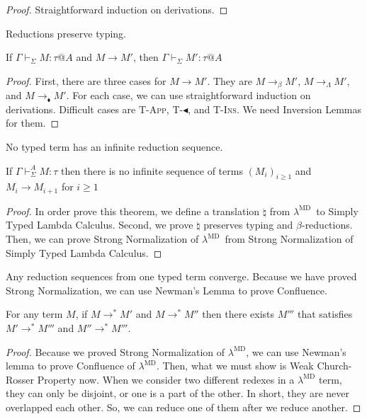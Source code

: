 \documentclass[runningheads]{llncs}
\newcommand{\LMD}{$\lambda^{\textrm{MD}}$\xspace}
\newcommand{\G}{\Gamma}
\newcommand{\V}{\vdash_\Sigma}
\newcommand{\TBL}{\blacktriangleleft}
\newcommand{\TApp}{\textsc{T-App}}
\newcommand{\TTBL}{\textsc{T-$\TBL$}}
\newcommand{\TIns}{\textsc{T-Ins}}
\begin{document}
\begin{proof}
	Straightforward induction on derivations.
\end{proof}

Reductions preserve typing.
\begin{theorem}[Preservation]
	If $\G\V M:\tau @A$ and $M \longrightarrow M'$, then $\G\V M':\tau @A$\\
\end{theorem}

\begin{proof}
	First, there are three cases for $M \longrightarrow M'$.
	They are $M \longrightarrow_\beta M'$, $M \longrightarrow_\Lambda M'$, and $M \longrightarrow_\blacklozenge M'$.
	For each case, we can use straightforward induction on derivations.
	Difficult cases are \TApp, \TTBL, and \TIns.
	We need Inversion Lemmas for them.
\end{proof}

No typed term has an infinite reduction sequence.
\begin{theorem}
	If $\G\V^A M:\tau$ then there is no infinite sequence of terms $(M_i)_{i\ge1}$ and 
	$M_i \longrightarrow M_{i+1}$ for $i\ge 1$
\end{theorem}

\begin{proof}
	In order prove this theorem, we define a translation $\natural$ from \LMD\ to Simply Typed Lambda Calculus.
	Second, we prove $\natural$ preserves typing and $\beta$-reductions.
	Then, we can prove Strong Normalization of \LMD\ from Strong Normalization of Simply Typed Lambda Calculus.
\end{proof}

Any reduction sequences from one typed term converge.
Because we have proved Strong Normalization, we can use Newman's Lemma to prove Confluence.
\begin{theorem}[Confluence]
	For any term $M$, if $M \longrightarrow^* M'$ and $M \longrightarrow^* M''$ then
	there exists $M'''$ that satisfies $M' \longrightarrow^* M'''$ and $M'' \longrightarrow^* M'''$.
\end{theorem}

\begin{proof}
	Because we proved Strong Normalization of \LMD, 
	we can use Newman's lemma to prove Confluence of \LMD.
	Then, what we must show is Weak Church-Rosser Property now.
	When we consider two different redexes in a \LMD term, they can only be disjoint, or one is a part of the other.
	In short, they are never overlapped each other.
	So, we can reduce one of them after we reduce another.
\end{proof}
\end{document}
